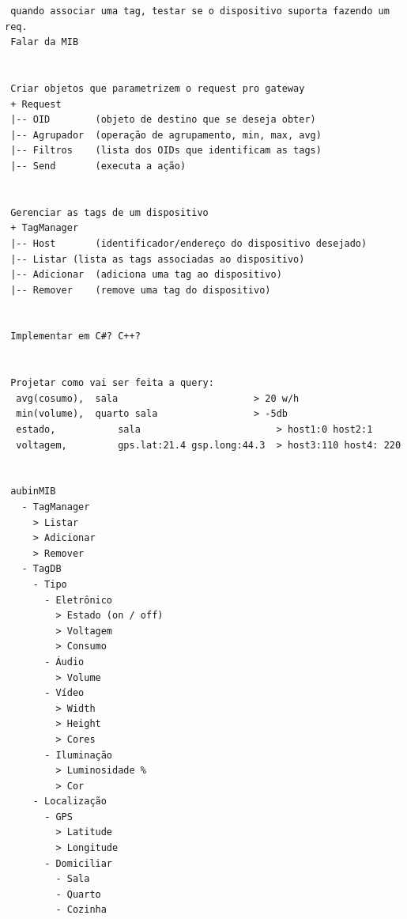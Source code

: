 \documentclass[twoside,english,brazilian]{UNISINOSmonografia}
\begin{document}
\begin{verbatim}
 quando associar uma tag, testar se o dispositivo suporta fazendo um req.
 Falar da MIB


 Criar objetos que parametrizem o request pro gateway
 + Request
 |-- OID 		(objeto de destino que se deseja obter)
 |-- Agrupador	(operação de agrupamento, min, max, avg)
 |-- Filtros	(lista dos OIDs que identificam as tags)
 |-- Send		(executa a ação)


 Gerenciar as tags de um dispositivo
 + TagManager
 |-- Host		(identificador/endereço do dispositivo desejado)
 |-- Listar	(lista as tags associadas ao dispositivo)
 |-- Adicionar	(adiciona uma tag ao dispositivo)
 |-- Remover	(remove uma tag do dispositivo)


 Implementar em C#? C++?


 Projetar como vai ser feita a query:
  avg(cosumo), 	sala 						> 20 w/h
  min(volume), 	quarto sala 				> -5db
  estado, 			sala 						> host1:0 host2:1
  voltagem, 		gps.lat:21.4 gsp.long:44.3 	> host3:110 host4: 220


 aubinMIB
   - TagManager
     > Listar
     > Adicionar
     > Remover
   - TagDB
     - Tipo
       - Eletrônico
         > Estado (on / off)
         > Voltagem
         > Consumo
       - Áudio
         > Volume
       - Vídeo
         > Width
         > Height
         > Cores
       - Iluminação
         > Luminosidade %
         > Cor
     - Localização
       - GPS
         > Latitude
         > Longitude
       - Domiciliar
         - Sala
         - Quarto
         - Cozinha
\end{verbatim}
  
% 
% 
% 
% 
% 
% 
% 
% 
\end{document}
